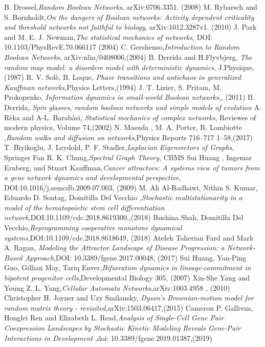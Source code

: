 \begin{thebibliography}{90}
 B. Drossel,\emph{Random Boolean Networks}, arXiv:0706.3351. (2008)
 M. Rybarsch and S. Bornholdt,\emph{On the dangers of Boolean networks:
Activity dependent criticality and threshold networks not faithful to biology}, arXiv:1012.3287v1. (2010)
 J. Park and M. E. J. Newman,\emph{The statistical mechanics of networks}, DOI: 10.1103/PhysRevE.70.066117 (2004)
 C. Gershenso,\emph{Introduction to Random Boolean Networks}, arXiv:nlin/0408006,(2004)
 B. Derrida and H.Flyvbjerg, \emph{The random map model: a disordere model with deterministic dynamics}, J.Physique, (1987)
 R. V. Solè, B. Loque, \emph{Phase transitions and antichaos in generalized Kauffman networks},Physics Letters,(1994)
 J. T. Lizier, S. Pritam, M. Prokopenko, \emph{Information dynamics in small-world Boolean networks},, (2011)
 B. Derrida, \emph{Spin glasses, random boolean networks and simple models of evolution}
 A. Rèka and A-L. Barabàsi, \emph{Statistical mechanics of complex networks}, Reviewes of modern physics, Volume 74,(2002)
 N. Masuda , M. A. Porter, R. Lambiotte ,\emph{Random walks and diffusion on networks},Physics Reports 716–717 1–58,(2017)
 T. Biyikoglu, J. Leydold, P. F. Stadler,\emph{Laplacian Eigenvectors of Graphs}, Springer
 Fan R. K. Chung,\emph{Spectral Graph Theory}, CBMS
 Sui Huang , Ingemar Ernberg, and Stuart Kauffman,\emph{Cancer attractors: A systems view of tumors from a gene network
dynamics and developmental perspective}, DOI:10.1016/j.semcdb.2009.07.003, (2009)
 M. Ali Al-Radhawi, Nithin S. Kumar, Eduardo D. Sontag, Domitilla Del Vecchio ,\emph{Stochastic multistationarity in a model of the hematopoietic
stem cell differentiation network},DOI:10.1109/cdc.2018.8619300.,(2018)
 Rushina Shah, Domitilla Del Vecchio,\emph{Reprogramming cooperative monotone dynamical systems},DOI:10.1109/cdc.2018.8618649, (2018)
 Atefeh Taherian Fard and Mark A. Ragan, \emph{Modeling the Attractor Landscape of
Disease Progression: a
Network-Based Approach},DOI: 10.3389/fgene.2017.00048, (2017)
 Sui Huang, Yan-Ping Guo, Gillian May, Tariq Enver,\emph{Bifurcation dynamics in lineage-commitment in bipotent progenitor cells},Developmental Biology 305, (2007)
 Xin-She Yang and Young Z. L. Yang,\emph{Cellular Automata Networks},arXiv:1003.4958 , (2010)
 Christopher H. Joyner and Uzy Smilansky, \emph{Dyson’s Brownian-motion model for random matrix
theory - revisited},arXiv:1503.06417,(2015)
 Cameron P. Gallivan, Honglei Ren and Elizabeth L. Read,\emph{Analysis of Single-Cell Gene Pair
Coexpression Landscapes by
Stochastic Kinetic Modeling Reveals
Gene-Pair Interactions in
Development} ,doi: 10.3389/fgene.2019.01387,(2019)


\end{thebibliography}
